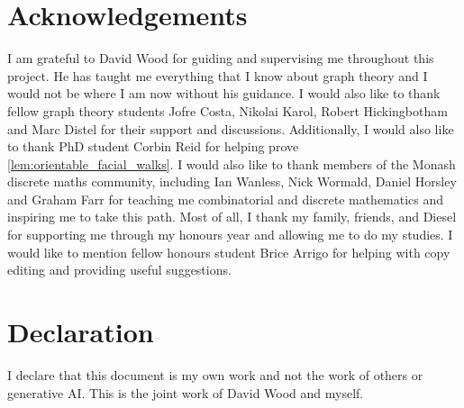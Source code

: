 
\section*{Acknowledgements}
I am grateful to David Wood for guiding and supervising me throughout this project. He has taught me everything that I know about graph theory and I would not be where I am now without his guidance. I would also like to thank fellow graph theory students Jofre Costa, Nikolai Karol, Robert Hickingbotham and Marc Distel for their support and discussions. Additionally, I would also like to thank PhD student Corbin Reid for helping prove \cref{lem:orientable_facial_walks}. I would also like to thank members of the Monash discrete maths community, including Ian Wanless, Nick Wormald, Daniel Horsley and Graham Farr for teaching me combinatorial and discrete mathematics and inspiring me to take this path. Most of all, I thank my family, friends, and Diesel for supporting me through my honours year and allowing me to do my studies. I would like to mention fellow honours student Brice Arrigo for helping with copy editing and providing useful suggestions.

\section*{Declaration}

I declare that this document is my own work and not the work of others or generative AI. This is the joint work of David Wood and myself.